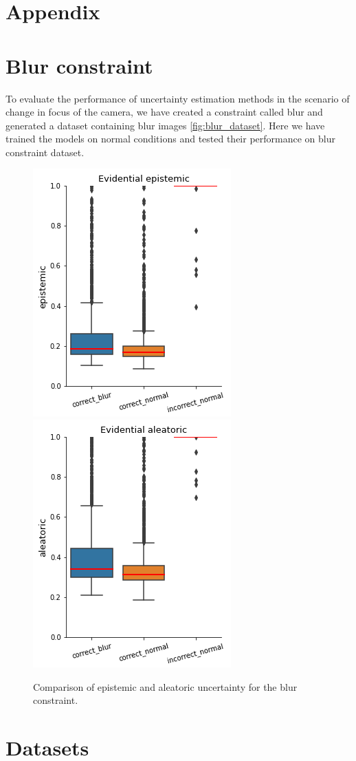 \hypertarget{appendix}{%
\section{Appendix}\label{appendix}}

\section{Blur constraint}
To evaluate the performance of uncertainty estimation methods in the scenario of change in focus of the camera, we have created a constraint called blur and generated a dataset containing blur images \ref{fig:blur_dataset}. Here we have trained the models on normal conditions and tested their performance on blur constraint dataset.
\begin{figure}[t]
	\centering
	\includegraphics[width=0.35\linewidth]{images/blur_epistemic_normal.png}
	\includegraphics[width=0.35\linewidth]{images/blur_aleatoric_normal.png}
	\caption[Disentanglement of uncertainty for blur constraint]{Comparison of epistemic and aleatoric uncertainty for the blur constraint.}
	\label{fig:overview}
\end{figure}

\section{Datasets}

